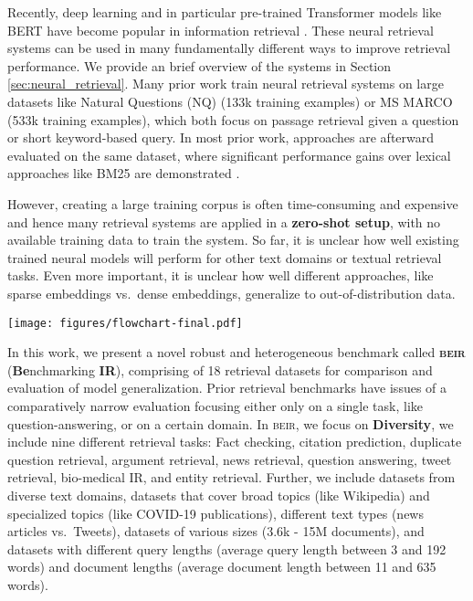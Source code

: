 \documentclass{article}
\newcommand{\custo}[1]{\textsc{\normalsize #1}}
\newcommand{\beir}{\custo{beir}\xspace}
\begin{document}
Recently, deep learning and in particular pre-trained Transformer models like BERT \cite{devlin2018bert} have become popular in information retrieval \cite{lin2020pretrained}. These neural retrieval systems can be used in many fundamentally different ways to improve retrieval performance. We provide an brief overview of the systems in Section \ref{sec:neural_retrieval}. Many prior work train neural retrieval systems on large datasets like Natural Questions (NQ) \cite{47761} (133k training examples) or MS MARCO \cite{nguyen2016ms} (533k training examples), which both focus on passage retrieval given a question or short keyword-based query. In most prior work, approaches are afterward evaluated on the same dataset, where significant performance gains over lexical approaches like BM25 are demonstrated \cite{ding2020rocketqa, karpukhin-etal-2020-dense, nogueira2020passage}.

However, creating a large training corpus is often time-consuming and expensive and hence many retrieval systems are applied in a \textbf{zero-shot setup}, with no available training data to  train the system. So far, it is unclear how well existing trained neural models will perform for other text domains or textual retrieval tasks. Even more important, it is unclear how well different approaches, like sparse embeddings vs.\ dense embeddings, generalize to out-of-distribution data.

 
\begin{figure*}[t]
    \centering
    \begin{center}
        \vspace{-7mm}
        \texttt{[image: figures/flowchart-final.pdf]}
        \caption{An overview of the diverse tasks and datasets in \beir benchmark. \vspace{-5mm}}
        \label{fig:beir-diagram}
    \end{center}
    \vspace*{-\baselineskip}
\end{figure*}

In this work, we present a novel robust and heterogeneous benchmark called \textbf{\beir} (\textbf{Be}nchmarking \textbf{IR}), comprising of 18 retrieval datasets for comparison and evaluation of model generalization. 
Prior retrieval benchmarks \citep{guo2020multireqa, petroni2020kilt} have issues of a comparatively narrow evaluation focusing either only on a single task, like question-answering, or on a certain domain. In \beir, we focus on \textbf{Diversity}, we include nine different retrieval tasks: Fact checking, citation prediction, duplicate question retrieval, argument retrieval, news retrieval, question answering, tweet retrieval, bio-medical IR, and entity retrieval. Further, we include datasets from diverse text domains, datasets that cover broad topics (like Wikipedia) and specialized topics (like COVID-19 publications), different text types (news articles vs.\ Tweets), datasets of various sizes (3.6k - 15M documents), and datasets with different query lengths (average query length between 3 and 192 words) and document lengths (average document length between 11 and 635 words).
\end{document}
